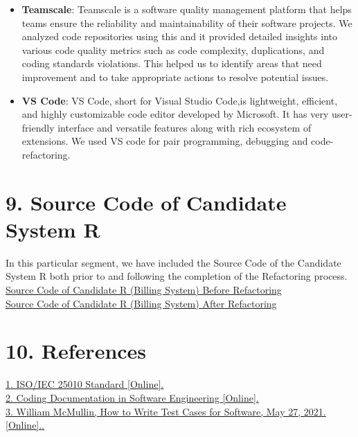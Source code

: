 \documentclass[12pt,letterpaper]{report}
\begin{document}
{\begin{itemize}
    \item \textbf{Teamscale}: Teamscale is a software quality management platform that helps teams ensure the reliability and maintainability of their software projects. We analyzed code repositories using this and it  provided detailed insights into various code quality metrics such as code complexity, duplications, and coding standards violations. This helped us to identify areas that need improvement and to take appropriate actions to resolve potential issues.

   \item \textbf{VS Code}: VS Code, short for Visual Studio Code,is lightweight, efficient, and highly customizable code editor developed by Microsoft. It has very user-friendly interface and versatile features along with rich ecosystem of extensions. We used VS code for pair programming, debugging and code-refactoring.
    
\end{itemize}


\section*{9. Source Code of Candidate System R}

\normalsize{
In this particular segment, we have included the Source Code of the Candidate System R both prior to and following the completion of the Refactoring process.\\

\href{https://github.com/mdhruvi/SOEN-6431-Deja-Vu/tree/main/Selected%20System/Billing-System-master}{Source Code of Candidate R (Billing System) Before Refactoring}\\

\href{https://github.com/mdhruvi/SOEN-6431-Deja-Vu/tree/main/R%20after%20ReEngineering}{Source Code of Candidate R  (Billing System) After Refactoring}\\

}

\section*{10. References}
\href{https://iso25000.com/index.php/en/iso-25000-standards/iso-25010}{1. ISO/IEC 25010 Standard [Online].\\
 \href{https://ecomputernotes.com/software-engineering/coding-documentation}{2. Coding Documentation in Software Engineering [Online]. }\\
 \href{https://www.parasoft.com/blog/how-to-write-test-cases-for-software-examples-tutorial/}{3. William McMullin, How to Write Test Cases for Software, May 27, 2021. [Online].}.\\

}}
\end{document}
